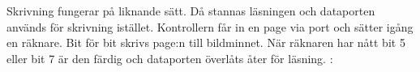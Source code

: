 \documentclass[main.tex]{subfiles}
\begin{document}
Skrivning fungerar på liknande sätt. Då stannas läsningen och dataporten
används för skrivning istället. Kontrollern får in en page via port 
och sätter igång en räknare. Bit för bit skrivs page:n till bildminnet.  När
räknaren har nått bit 5 eller bit 7 är den färdig och dataporten överlåts åter
för läsning.
:
\end{document}
